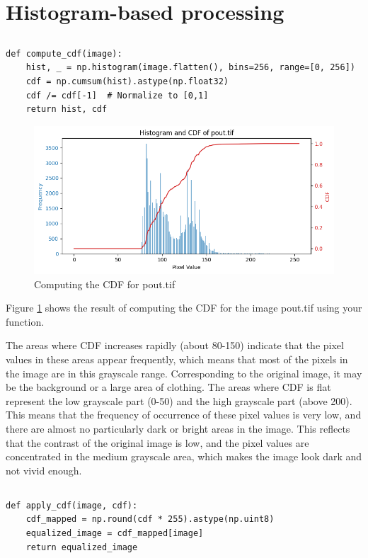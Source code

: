 \documentclass[12pt]{article}
\begin{document}
\section{Histogram-based processing}
\subsection{}
\begin{lstlisting}[caption={CDF Calculation},captionpos=b]
def compute_cdf(image):
    hist, _ = np.histogram(image.flatten(), bins=256, range=[0, 256])
    cdf = np.cumsum(hist).astype(np.float32)
    cdf /= cdf[-1]  # Normalize to [0,1]
    return hist, cdf
\end{lstlisting}

\begin{figure}[ht]
        \centering
            \includegraphics[width=0.7\columnwidth, keepaspectratio]{pics/a2-4.1}
        \caption[]{Computing the CDF for pout.tif}
    \label{fig:4.1}
    \end{figure}

Figure \ref{fig:4.1} shows the result of computing the CDF for the image pout.tif using your function.

The areas where CDF increases rapidly (about 80-150) indicate that the pixel values in these areas appear frequently, which means that most of the pixels in the image are in this grayscale range. Corresponding to the original image, it may be the background or a large area of clothing.
The areas where CDF is flat represent
the low grayscale part (0-50) and the high grayscale part (above 200). This means that the frequency of occurrence of these pixel values is very low, and there are almost no particularly dark or bright areas in the image. This reflects that the contrast of the original image is low, and the pixel values are concentrated in the medium grayscale area, which makes the image look dark and not vivid enough.

\subsection{}
\begin{lstlisting}[caption={Apply CDF Transformation to Image},captionpos=b]
def apply_cdf(image, cdf):
    cdf_mapped = np.round(cdf * 255).astype(np.uint8)
    equalized_image = cdf_mapped[image]
    return equalized_image
\end{lstlisting}
\end{document}
